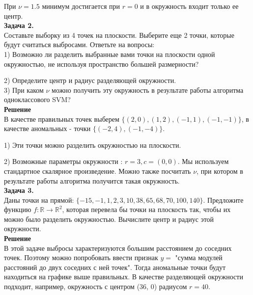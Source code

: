 При $\nu = 1.5$ минимум достигается при $r = 0$ и в окружность входит только ее центр. \\

\textbf{Задача 2.} \\

Составьте выборку из 4 точек на плоскости. Выберите еще 2 точки, которые будут считаться выбросами. Ответьте на вопросы: \\

1) Возможно ли разделить выбранные вами точки на плоскости одной окружностью, не используя пространство большей размерности?

2) Определите центр и радиус разделяющей окружности. \\

3) При каком $\nu$ можно получить эту окружность в результате работы алгоритма одноклассового SVM?\\

\textbf{Решение} \\

В качестве правильных точек выберем $\{(2,0), (1,2), (-1,1), (-1,-1)\}$, в качестве аномальных - точки $\{(-2,4), (-1,-4)\}$.

1) Эти точки можно разделить окружностью на плоскости.

2) Возможные параметры окружности : $r = 3, c = (0,0)$. Мы используем стандартное скалярное произведение. Можно также посчитать $\nu$, при котором в результате работы алгоритма получится такая окружность. \\

\textbf{Задача 3.} \\

Даны точки на прямой: $\{-15, -1, 1, 2, 3, 10, 38, 65, 68, 70, 100, 140\}$. Предложите функцию $f: \mathbb{R} \rightarrow \mathbb{R}^2$, которая перевела бы точки на плоскость так, чтобы их можно было разделить окружностью. Вычислите центр и радиус этой окружности.\\

\textbf{Решение} \\

В этой задаче выбросы характеризуются большим расстоянием до соседних точек. Поэтому можно попробовать ввести признак $y = $ "сумма модулей расстояний до двух соседних с ней точек". Тогда аномальные точки будут находиться на графике выше правильных. В качестве разделяющей окружности подходит, например, окружность с центром (36, 0) радиусом $r = 40$.

